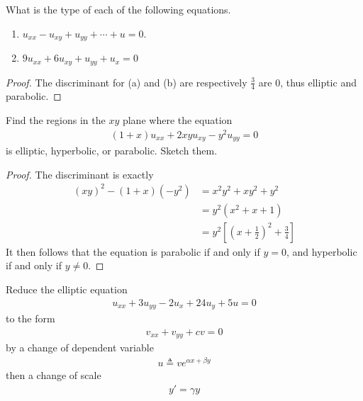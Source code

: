 \documentclass{report}
\begin{document}
\begin{question}{}{}
What is the type of each of the following equations. 
\begin{enumerate}[label=(\alph*)]
  \item $u_{xx}-u_{xy}+u_{yy}+\cdots +u =0$. 
  \item $9u_{xx}+6u_{xy}+u_{yy}+u_x=0$
\end{enumerate}
\end{question}
\begin{proof}
The discriminant for (a) and (b) are respectively  $\frac{3}{4}$ are $0$, thus elliptic and parabolic. 
\end{proof}
\begin{question}{}{}
Find the regions in the $xy$ plane where the equation 
 \begin{align*}
   (1+x)u_{xx}+2xyu_{xy}-y^2u_{yy}=0
\end{align*}
is elliptic, hyperbolic, or parabolic. Sketch them. 
\end{question}
\begin{proof}
The discriminant is exactly 
\begin{align*}
  (xy)^2- (1+x)(-y^2)&=x^2y^2+xy^2+y^2\\
  &=y^2 (x^2+x+1)\\
  &=y^2[(x+\frac{1}{2})^2+ \frac{3}{4}]
\end{align*}
It then follows that the equation is parabolic if and only if $y=0$, and hyperbolic if and only if  $y\neq 0$. 

\end{proof}
\begin{question}{}{}
Reduce the elliptic equation 
\begin{align*}
u_{xx}+3u_{yy}-2u_x+24u_y+5u=0
\end{align*}
to the form 
\begin{align*}
v_{xx}+v_{yy}+cv=0
\end{align*}
by a change of dependent variable 
\begin{align*}
u\triangleq ve^{\alpha x+\beta  y}
\end{align*}
then a change of scale 
\begin{align*}
y'=\gamma y
\end{align*}
\end{question}
\end{document}
